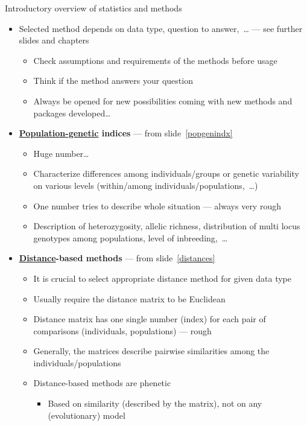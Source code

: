 \documentclass[compress, ucs, xelatex, 11pt, xcolor=svgnames, aspectratio=169,
	hyperref={
		bookmarks=true,
		unicode=true,
		colorlinks=true,
		pdftitle={Molecular data in R},
		plainpages=false,
		pdfauthor={Vojtech Zeisek},
		pdfsubject={Course about phylogeny and evolution in R},
		pdfcreator={XeLaTeX},
		pdfkeywords={R, evolution, phylogeny, molecular data},
		linkcolor=Crimson, %
		anchorcolor=Magenta, %
		citecolor=Magenta, %
		filecolor=Magenta, %
		menucolor=Magenta, %
		urlcolor=DodgerBlue, %
		pdftex},
	url={hyphens, lowtilde} %
	]{beamer}
\begin{document}
\begin{frame}[allowframebreaks]{Introductory overview of statistics and methods}
	\begin{itemize}
		\item \alert{Selected method depends on data type, question to answer,~\ldots}{ }--- see further slides and chapters
		\begin{itemize}
			\item Check assumptions and requirements of the methods before usage
			\item Think if the method answers your question
			\item Always be opened for new possibilities coming with new methods and packages developed\ldots
		\end{itemize}
		\item \textbf{\href{https://en.wikipedia.org/wiki/Population_genetics}{Population-genetic} indices} --- from slide~\ref{popgenindx}
		\begin{itemize}
			\item Huge number\ldots
			\item Characterize differences among individuals/groups or genetic variability on various levels (within/among individuals/populations,~\ldots)
			\item One number tries to describe whole situation --- always very rough
			\item Description of heterozygosity, allelic richness, distribution of multi locus genotypes among populations, level of inbreeding,~\ldots
		\end{itemize}
		\item \textbf{\href{https://en.wikipedia.org/wiki/Genetic_distance}{Distance}-based methods} --- from slide~\ref{distances}
		\begin{itemize}
			\item \alert{It is crucial to select appropriate distance method for given data type}
			\item Usually require the distance matrix to be Euclidean
			\item Distance matrix has one single number (index) for each pair of comparisons (individuals, populations) --- rough
			\item Generally, the matrices describe pairwise similarities among the individuals/populations
			\item Distance-based methods are phenetic
			\begin{itemize}
				\item Based on similarity (described by the matrix), not on any (evolutionary) model

\end{itemize}
\end{itemize}
\end{itemize}
\end{frame}
\end{document}
